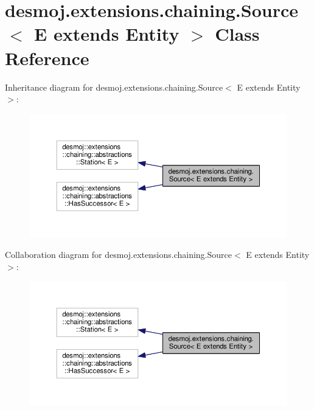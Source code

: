 \section{desmoj.\-extensions.\-chaining.\-Source$<$ E extends Entity $>$ Class Reference}
\label{classdesmoj_1_1extensions_1_1chaining_1_1_source_3_01_e_01extends_01_entity_01_4}


Inheritance diagram for desmoj.\-extensions.\-chaining.\-Source$<$ E extends Entity $>$\-:
\nopagebreak
\begin{figure}[H]
\begin{center}
\leavevmode
\includegraphics[width=350pt]{classdesmoj_1_1extensions_1_1chaining_1_1_source_3_01_e_01extends_01_entity_01_4__inherit__graph}
\end{center}
\end{figure}


Collaboration diagram for desmoj.\-extensions.\-chaining.\-Source$<$ E extends Entity $>$\-:
\nopagebreak
\begin{figure}[H]
\begin{center}
\leavevmode
\includegraphics[width=350pt]{classdesmoj_1_1extensions_1_1chaining_1_1_source_3_01_e_01extends_01_entity_01_4__coll__graph}
\end{center}
\end{figure}
